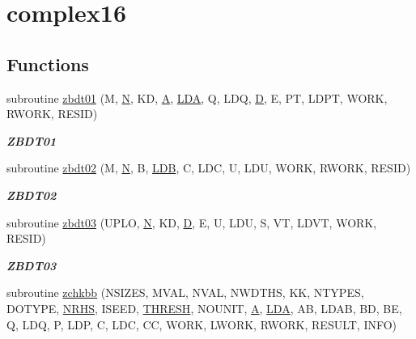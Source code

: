 \hypertarget{group__complex16__eig}{}\section{complex16}
\label{group__complex16__eig}
\subsection*{Functions}
\begin{DoxyCompactItemize}
\item 
subroutine \hyperlink{group__complex16__eig_ga4447fac086ee96b40677482c9e273ac8}{zbdt01} (M, \hyperlink{polmisc_8c_a0240ac851181b84ac374872dc5434ee4}{N}, K\+D, \hyperlink{classA}{A}, \hyperlink{example__user_8c_ae946da542ce0db94dced19b2ecefd1aa}{L\+D\+A}, Q, L\+D\+Q, \hyperlink{odrpack_8h_a7dae6ea403d00f3687f24a874e67d139}{D}, E, P\+T, L\+D\+P\+T, W\+O\+R\+K, R\+W\+O\+R\+K, R\+E\+S\+I\+D)
\begin{DoxyCompactList}\small\item\em {\bfseries Z\+B\+D\+T01} \end{DoxyCompactList}\item 
subroutine \hyperlink{group__complex16__eig_gae2e86e0081ec0a0bd76bad8463394dc5}{zbdt02} (M, \hyperlink{polmisc_8c_a0240ac851181b84ac374872dc5434ee4}{N}, B, \hyperlink{example__user_8c_a50e90a7104df172b5a89a06c47fcca04}{L\+D\+B}, C, L\+D\+C, U, L\+D\+U, W\+O\+R\+K, R\+W\+O\+R\+K, R\+E\+S\+I\+D)
\begin{DoxyCompactList}\small\item\em {\bfseries Z\+B\+D\+T02} \end{DoxyCompactList}\item 
subroutine \hyperlink{group__complex16__eig_ga9fb67a93383bedd0a2573cc1e4e38008}{zbdt03} (U\+P\+L\+O, \hyperlink{polmisc_8c_a0240ac851181b84ac374872dc5434ee4}{N}, K\+D, \hyperlink{odrpack_8h_a7dae6ea403d00f3687f24a874e67d139}{D}, E, U, L\+D\+U, S, V\+T, L\+D\+V\+T, W\+O\+R\+K, R\+E\+S\+I\+D)
\begin{DoxyCompactList}\small\item\em {\bfseries Z\+B\+D\+T03} \end{DoxyCompactList}\item 
subroutine \hyperlink{group__complex16__eig_gae5f31f8b72cd1f618622fe93c6b9eac1}{zchkbb} (N\+S\+I\+Z\+E\+S, M\+V\+A\+L, N\+V\+A\+L, N\+W\+D\+T\+H\+S, K\+K, N\+T\+Y\+P\+E\+S, D\+O\+T\+Y\+P\+E, \hyperlink{example__user_8c_aa0138da002ce2a90360df2f521eb3198}{N\+R\+H\+S}, I\+S\+E\+E\+D, \hyperlink{zlaqgs_8c_a0656018abfc9fa2821827415f5d5ea57}{T\+H\+R\+E\+S\+H}, N\+O\+U\+N\+I\+T, \hyperlink{classA}{A}, \hyperlink{example__user_8c_ae946da542ce0db94dced19b2ecefd1aa}{L\+D\+A}, A\+B, L\+D\+A\+B, B\+D, B\+E, Q, L\+D\+Q, P, L\+D\+P, C, L\+D\+C, C\+C, W\+O\+R\+K, L\+W\+O\+R\+K, R\+W\+O\+R\+K, R\+E\+S\+U\+L\+T, I\+N\+F\+O)

\end{DoxyCompactItemize}
